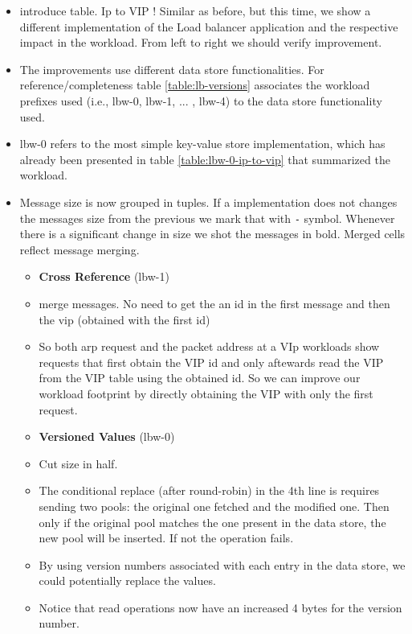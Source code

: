 \begin{itemize}

\item introduce table.  Ip to VIP ! Similar as before, but this time, we show a
  different implementation of the Load balancer application and the
  respective impact in the workload.  From left to right we should
  verify improvement. 

\item The improvements use different data store functionalities. For
  reference/completeness table \ref{table:lb-versions} associates the workload
  prefixes used (i.e., lbw-0, lbw-1, ... , lbw-4) to the data store
  functionality used. 

\item lbw-0 refers to the most simple key-value store implementation,
  which has already been presented in table
  \ref{table:lbw-0-ip-to-vip} that summarized the workload.


\item Message size is now grouped in tuples. If a implementation does
  not changes the messages size from the previous we mark that with
  \texttt{-} symbol.  Whenever there is a significant change in size
  we shot the messages in bold. Merged cells reflect message merging. 


\begin{itemize}
\item \textbf{Cross Reference} (lbw-1) 
\item merge messages. No need to get the an id in the first
  message and then the vip (obtained with the first id) 
\item  So both arp request and the packet address at a VIp workloads show
requests that first obtain the VIP id and only aftewards read the VIP
from the VIP table using the obtained id. So we can improve our
workload footprint by directly obtaining the VIP with only the first
request. 
\end{itemize}

\begin{itemize}
\item \textbf{Versioned Values} (lbw-0)
\item Cut size in half. 
\item The conditional replace (after round-robin) in the 4th line is
  requires sending two pools: the original one fetched and the
  modified one.  Then only if the original pool matches the one
  present in the data store, the new pool will be inserted. If not the
  operation fails. 
\item By using version numbers associated with each entry in the data
  store, we could potentially replace the values. 
\item Notice that read operations now have an increased 4 bytes for
  the version number. 
\end{itemize}


\end{itemize}
